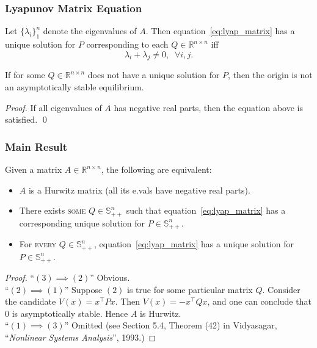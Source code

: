 \begin{frame}
    \frametitle{Lyapunov Matrix Equation}

    \begin{lemma}
        Let $\{\lambda_i\}_1^n$ denote the eigenvalues of $A$. Then
        equation~\eqref{eq:lyap_matrix} has a unique solution for $P$
        corresponding to each $Q \in \mathbb{R}^{n \times n}$ iff \[ \lambda_i +
        \lambda_j \neq 0, \;\; \forall i, j. \]
    \end{lemma}

    \begin{corollary}
        If for some $Q \in \mathbb{R}^{n \times n}$ does not have a unique
        solution for $P$, then the origin is not an asymptotically stable
        equilibrium.
    \end{corollary}
    \begin{proof}
        If all eigenvalues of $A$ has negative real parts, then the equation 
        above is satisfied. \hfill \qed
    \end{proof}
\end{frame}


\begin{frame}
    \frametitle{Main Result}

    \begin{theorem}
        Given a matrix $A \in \mathbb{R}^{n \times n}$, the following are
        equivalent:
        \begin{itemize}
            \item $A$ is a Hurwitz matrix (all its e.vals have negative real parts).
            \item There exists \textsc{some} $Q \in \mathbb{S}_{++}^n$ such that
            equation~\eqref{eq:lyap_matrix} has a corresponding unique solution
            for $P \in \mathbb{S}_{++}^n$.
            \item For \textsc{every} $Q \in \mathbb{S}_{++}^n$,
            equation~\eqref{eq:lyap_matrix} has a unique solution for $P \in
            \mathbb{S}_{++}^n$.
        \end{itemize}
    \end{theorem}
    \begin{proof}
        ``$(3) \implies (2)$'' Obvious. \\
        ``$(2) \implies (1)$'' Suppose $(2)$ is true for some particular matrix
        $Q$. Consider the candidate $V(x) = x^\top P x$. Then $\dot{V}(x) =
        -x^\top Q x$, and one can conclude that $0$ is asymptotically stable. 
        Hence $A$ is Hurwitz. \\
        ``$(1) \implies (3)$'' Omitted (see Section 5.4, Theorem (42) in
        Vidyasagar, ``\textit{Nonlinear Systems Analysis}'', 1993.)
    \end{proof}
\end{frame}


\endgroup